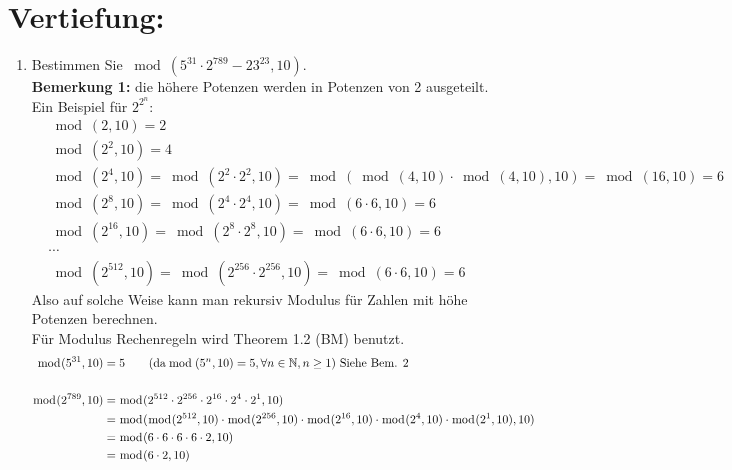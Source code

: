 



	\maketitle
	\section*{Vertiefung:}
	\begin{enumerate}[label=(\alph*)]
		\item  Bestimmen Sie $ \bmod(5^{31} \cdot 2^{789}-23^{23}, 10) $. \\
		\textbf{Bemerkung 1:} die h\"ohere Potenzen werden in Potenzen von 2 ausgeteilt.\\ Ein Beispiel f\"ur $2^{2^n}$:
		\begin{align*}
			&\bmod(2,10)=2\\
			&\bmod(2^2,10)=4\\
			&\bmod(2^4,10)=\bmod(2^2\cdot2^2,10)=\bmod(\bmod(4,10)\cdot\bmod(4,10),10)=\bmod(16,10)=6\\
			&\bmod(2^8,10)=\bmod(2^4\cdot2^4,10)=\bmod(6\cdot6,10)=6\\
			&\bmod(2^{16},10)=\bmod(2^8\cdot2^8,10)=\bmod(6\cdot6,10)=6\\
			&\cdots \\
			&\bmod(2^{512},10)=\bmod(2^{256}\cdot2^{256},10)=\bmod(6\cdot6,10)=6
		\end{align*}
		Also auf solche Weise kann man rekursiv Modulus f\"ur Zahlen mit h\"ohe Potenzen berechnen.\\
		F\"ur Modulus Rechenregeln wird Theorem 1.2 (BM) benutzt. \\
		\begin{align*}
			\bmod(5^{31},10) &= 5  \textrm{\qquad (da} \bmod(5^n,10)=5, \forall n \in \mathbb{N}, n\geq1)  \textrm{ Siehe Bem. 2} \\\\
			\bmod(2^{789},10) &= \bmod(2^{512}\cdot2^{256}\cdot2^{16}\cdot2^4\cdot2^1,10) 
			\\&= \bmod(\bmod(2^{512},10)\cdot\bmod(2^{256},10)\cdot\bmod(2^{16},10)\cdot\bmod(2^4,10)\cdot\bmod(2^1,10),10)
			\\&= \bmod(6\cdot 6\cdot 6\cdot 6\cdot 2, 10)
			\\&= \bmod(6\cdot2,10) 

\end{align*}
\end{enumerate}

